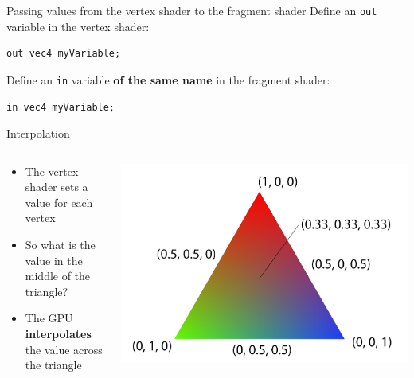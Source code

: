 \begin{frame}[fragile]{Passing values from the vertex shader to the fragment shader}
	\pause Define an \lstinline{out} variable in the vertex shader:
	\pause \begin{lstlisting}
out vec4 myVariable;
	\end{lstlisting}
	\pause Define an \lstinline{in} variable \textbf{of the same name} in the fragment shader:
	\pause \begin{lstlisting}
in vec4 myVariable;
	\end{lstlisting}
\end{frame}

\begin{frame}{Interpolation}
	\begin{columns}
		\begin{column}{0.5\textwidth}
			\begin{itemize}
				\pause\item The vertex shader sets a value for each vertex
				\pause\item So what is the value in the middle of the triangle?
				\pause\item The GPU \textbf{interpolates} the value across the triangle
			\end{itemize}
		\end{column}
		\begin{column}{0.45\textwidth}
			\pause\includegraphics[width=\textwidth]{interpolation}
		\end{column}
	\end{columns}
\end{frame}
